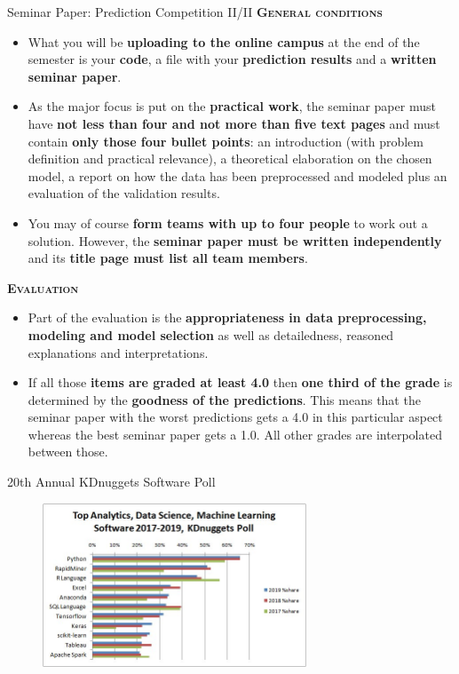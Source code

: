 \documentclass[document.tex]{subfiles}
\begin{document}
    \begin{frame}{Seminar Paper: Prediction Competition II/II}
        \alert{\textbf{\textsc{General conditions}}}
        \vspace{-1mm}
        \begin{itemize}
            \item What you will be \textbf{uploading to the online campus} at the end of the semester is your \textbf{code}, a file with your \textbf{prediction results} and a \textbf{written seminar paper}.
            \item As the major focus is put on the \textbf{practical work}, the seminar paper must have \textbf{not less than four and not more than five text pages} and must contain \textbf{only those four bullet points}: an introduction (with problem definition and practical relevance), a theoretical elaboration on the chosen model, a report on how the data has been preprocessed and modeled plus an evaluation of the validation results.
            \item You may of course \textbf{form teams with up to four people} to work out a solution. However, the \textbf{seminar paper must be written independently} and its \textbf{title page must list all team members}.
        \end{itemize}
        \alert{\textbf{\textsc{Evaluation}}}
        \vspace{-1mm}
        \begin{itemize}
            \item Part of the evaluation is the \textbf{appropriateness in data preprocessing, modeling and model selection} as well as detailedness, reasoned explanations and interpretations.
            \item If all those \textbf{items are graded at least 4.0} then \textbf{one third of the grade} is determined by the \textbf{goodness of the predictions}. This means that the seminar paper with the worst predictions gets a 4.0 in this particular aspect whereas the best seminar paper gets a 1.0. All other grades are interpolated between those.
        \end{itemize}
    \end{frame}

    \begin{frame}{20th Annual KDnuggets Software Poll}
        \begin{figure}
            \label{fig:kdnuggets-poll-2019}
            \includegraphics[width=0.7\textwidth]{figures/external/kdnuggets-poll-2019.jpg}
        \end{figure}
    \end{frame}
    
\end{document}
